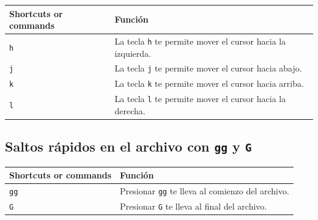 \documentclass[
  doc,
  floatsintext,
  longtable,
  a4paper,
  nolmodern,
  notxfonts,
  notimes,
  12pt,
  colorlinks=true,linkcolor=blue,citecolor=blue,urlcolor=blue]{apa7}
\newcounter{none} %
\begin{document}
{\def\LTcaptype{none} %
\begin{longtable}[]{@{}
  >{\raggedright\arraybackslash}p{}
  >{\raggedright\arraybackslash}p{}@{}}
\toprule\noalign{}
\begin{minipage}[b]{\linewidth}\raggedright
Shortcuts or commands
\end{minipage} & \begin{minipage}[b]{\linewidth}\raggedright
Función
\end{minipage} \\
\midrule\noalign{}
\endhead
\bottomrule\noalign{}
\endlastfoot
\texttt{h} & La tecla \texttt{h} te permite mover el cursor hacia la
izquierda. \\
\texttt{j} & La tecla \texttt{j} te permite mover el cursor hacia
abajo. \\
\texttt{k} & La tecla \texttt{k} te permite mover el cursor hacia
arriba. \\
\texttt{l} & La tecla \texttt{l} te permite mover el cursor hacia la
derecha. \\
\end{longtable}
}

\subsection{\texorpdfstring{Saltos rápidos en el archivo con \texttt{gg}
y
\texttt{G}}{Saltos rápidos en el archivo con gg y G}}\label{saltos-ruxe1pidos-en-el-archivo-con-gg-y-g}

{\def\LTcaptype{none} %
\begin{longtable}[]{@{}
  >{\raggedright\arraybackslash}p{}
  >{\raggedright\arraybackslash}p{}@{}}
\toprule\noalign{}
\begin{minipage}[b]{\linewidth}\raggedright
Shortcuts or commands
\end{minipage} & \begin{minipage}[b]{\linewidth}\raggedright
Función
\end{minipage} \\
\midrule\noalign{}
\endhead
\bottomrule\noalign{}
\endlastfoot
\texttt{gg} & Presionar \texttt{gg} te lleva al comienzo del archivo. \\
\texttt{G} & Presionar \texttt{G} te lleva al final del archivo. \\
\end{longtable}
}
\end{document}
